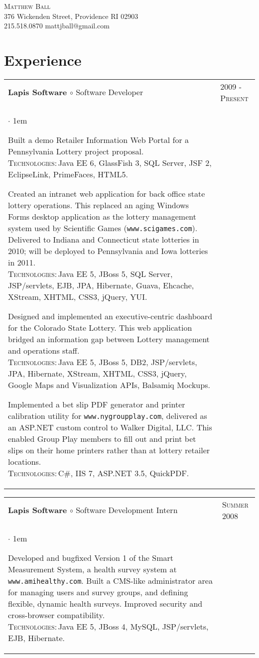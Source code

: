 \documentclass[10pt]{article}
\makeatletter
\newcommand{\employer}[4]
	{{ \begin{tabular}{l@{\hspace{5mm}}|p{30mm}}
	   \multicolumn{1}{l}{\textbf{#1 $\circ$ }#2}&\multicolumn{1}{p{30mm}}{\hspace{-3mm}\textsc{#3}} \\
	   \parbox{.825\textwidth}{#4 \vspace*{-4pt}}
	   \end{tabular} \vspace{4pt} }}
\newcommand{\contact}[4]
	{\begin{center}
		{\LARGE \scshape{#1}}\\
		#2\\
		\Telefon \hspace{0.5ex} #3 \hspace{1em} \Letter \hspace{0.5ex} #4
	\end{center}
	\vspace*{-8pt}}
\newenvironment{achievements}           %
	{\begin{list}{$\cdot$}{\topsep 0pt \itemsep 4pt \parsep 0pt \leftmargin 1em}
	 \linespread{1.05} \selectfont %
	}
	{\end{list}\vspace*{4pt}}
\def\kt{\vspace*{2pt}\\\textsc{Technologies:\,}}
\makeatother
\begin{document}
\contact{Matthew Ball}
{376 Wickenden Street, Providence RI 02903}
{215.518.0870}
{mattjball@gmail.com}

\section{Experience}
\employer{Lapis Software}{Software Developer}{2009 - Present}{
	\begin{achievements}
	
	\item{Built a demo Retailer Information Web Portal for a Pennsylvania Lottery project proposal. \kt Java EE 6, GlassFish 3, SQL Server, JSF 2, EclipseLink, PrimeFaces, HTML5.}
	
	\item{Created an intranet web application for back office state lottery operations. This replaced an aging Windows Forms desktop application as the lottery management system used by Scientific Games (\texttt{www.scigames.com}). Delivered to Indiana and Connecticut state lotteries in 2010; will be deployed to Pennsylvania and Iowa lotteries in 2011. \kt Java EE 5, JBoss 5, SQL Server, JSP/servlets, EJB, JPA, Hibernate, Guava, Ehcache, XStream, XHTML, CSS3, jQuery, YUI.}
	
	\item{Designed and implemented an executive-centric dashboard for the Colorado State Lottery. This web application bridged an information gap between Lottery management and operations staff. \kt Java EE 5, JBoss 5, DB2, JSP/servlets, JPA, Hibernate, XStream, XHTML, CSS3, jQuery, Google Maps and Visualization APIs, Balsamiq Mockups.}
	
	\item{Implemented a bet slip PDF generator and printer calibration utility for \texttt{www.nygroupplay.com}, delivered as an ASP.NET custom control to Walker Digital, LLC. This enabled Group Play members to fill out and print bet slips on their home printers rather than at lottery retailer locations. \kt C\#, IIS 7, ASP.NET 3.5, QuickPDF.}
	
	\end{achievements}
}

\employer{Lapis Software}{Software Development Intern}{Summer 2008}{
	\begin{achievements}
	
	\item{Developed and bugfixed Version 1 of the Smart Measurement System, a health survey system at \texttt{www.amihealthy.com}. Built a CMS-like administrator area for managing users and survey groups, and defining flexible, dynamic health surveys. Improved security and cross-browser compatibility. \kt Java EE 5, JBoss 4, MySQL, JSP/servlets, EJB, Hibernate.}
	
	\end{achievements}
}
\end{document}
